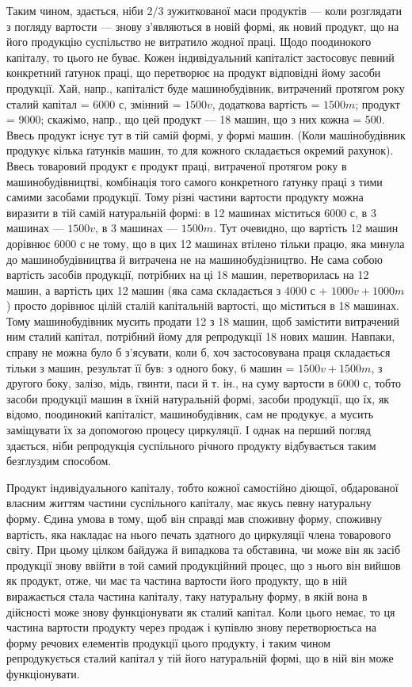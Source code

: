 \parcont{}  %
Таким чином, здається, ніби 2/3 зужиткованої маси продуктів — коли
розглядати з погляду вартости — знову з’являються в новій формі, як
новий продукт, що на його продукцію суспільство не витратило
жодної праці. Щодо поодинокого капіталу, то цього не буває. Кожен індивідуальний
капіталіст застосовує певний конкретний ґатунок праці, що перетворює
на продукт відповідні йому засоби продукції. Хай, напр., капіталіст
буде машинобудівник, витрачений протягом року сталий капітал = 6000 с,
змінний = $1500 v$, додаткова вартість = $1500 m$; продукт = 9000; скажімо,
напр., що цей продукт — 18 машин, що з них кожна = 500. Ввесь продукт
існує тут в тій самій формі, у формі машин. (Коли машінобудівник продукує
кілька ґатунків машин, то для кожного складається окремий рахунок).
Ввесь товаровий продукт є продукт праці, витраченої протягом
року в машинобудівництві, комбінація того самого конкретного ґатунку
праці з тими самими засобами продукції. Тому різні частини вартости
продукту можна виразити в тій самій натуральній формі: в 12 машинах
міститься 6000 с, в 3 машинах — $1500 v$, в 3 машинах — $1500 m$. Тут
очевидно, що вартість 12 машин дорівнює 6000 с не тому, що в цих
12 машинах втілено тільки працю, яка минула до машинобудівництва й
витрачена не на машинобудізництво. Не сама собою вартість засобів
продукції, потрібних на ці 18 машин, перетворилась на 12 машин, а вартість
цих 12 машин (яка сама складається з 4000 с + $1000 v + 1000 m$)
просто дорівнює цілій сталій капітальній вартості, що міститься в 18 машинах.
Тому машинобудівник мусить продати 12 з 18 машин, щоб замістити
витрачений ним сталий капітал, потрібний йому для репродукції 18
нових машин. Навпаки, справу не можна було б з’ясувати, коли б, хоч
застосовувана праця складається тільки з машин, результат її був: з
одного боку, 6 машин = $1500 v + 1500 m$, з другого боку, залізо,
мідь, гвинти, паси й т. ін., на суму вартости в 6000 с, тобто засоби продукції
машин в їхній натуральній формі, засоби продукції, що їх, як відомо,
поодинокий капіталіст, машинобудівник, сам не продукує, а мусить
заміщувати їх за допомогою процесу циркуляції. І однак на перший погляд
здається, ніби репродукція суспільного річного продукту відбувається
таким безглуздим способом.

Продукт індивідуального капіталу, тобто кожної самостійно діющої,
обдарованої власним життям частини суспільного капіталу, має якусь певну
натуральну форму. Єдина умова в тому, щоб він справді мав споживну
форму, споживну вартість, яка накладає на нього печать здатного до
циркуляції члена товарового світу. При цьому цілком байдужа й випадкова
та обставина, чи може він як засіб продукції знову ввійти в той
самий продукційний процес, що з нього він вийшов як продукт, отже, чи
має та частина вартости його продукту, що в ній виражається стала частина
капіталу, таку натуральну форму, в якій вона в дійсності може знову
функціонувати як сталий капітал. Коли цього немає, то ця частина вартости
продукту через продаж і купівлю знову перетворюєтьса на форму речових
елементів продукції цього продукту, і таким чином репродукується сталий
капітал у тій його натуральній формі, що в ній він може функціонувати.
